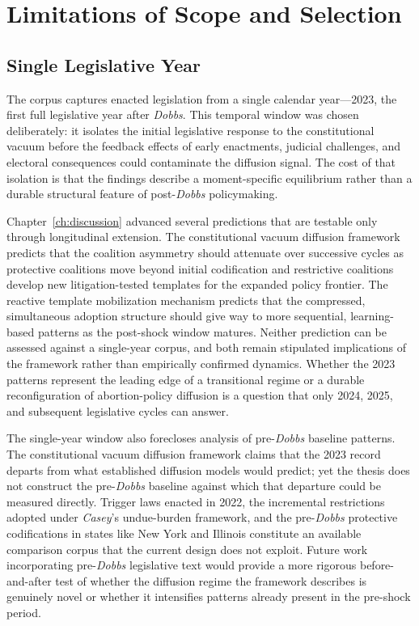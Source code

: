 \section{Limitations of Scope and Selection}
\label{sec:limits-scope}

\subsection{Single Legislative Year}
\label{subsec:single-year}

The corpus captures enacted legislation from a single calendar year---2023, the first full legislative year after \emph{Dobbs}. This temporal window was chosen deliberately: it isolates the initial legislative response to the constitutional vacuum before the feedback effects of early enactments, judicial challenges, and electoral consequences could contaminate the diffusion signal. The cost of that isolation is that the findings describe a moment-specific equilibrium rather than a durable structural feature of post-\emph{Dobbs} policymaking.

Chapter~\ref{ch:discussion} advanced several predictions that are testable only through longitudinal extension. The constitutional vacuum diffusion framework predicts that the coalition asymmetry should attenuate over successive cycles as protective coalitions move beyond initial codification and restrictive coalitions develop new litigation-tested templates for the expanded policy frontier. The reactive template mobilization mechanism predicts that the compressed, simultaneous adoption structure should give way to more sequential, learning-based patterns as the post-shock window matures. Neither prediction can be assessed against a single-year corpus, and both remain stipulated implications of the framework rather than empirically confirmed dynamics. Whether the 2023 patterns represent the leading edge of a transitional regime or a durable reconfiguration of abortion-policy diffusion is a question that only 2024, 2025, and subsequent legislative cycles can answer.

The single-year window also forecloses analysis of pre-\emph{Dobbs} baseline patterns. The constitutional vacuum diffusion framework claims that the 2023 record departs from what established diffusion models would predict; yet the thesis does not construct the pre-\emph{Dobbs} baseline against which that departure could be measured directly. Trigger laws enacted in 2022, the incremental restrictions adopted under \emph{Casey}'s undue-burden framework, and the pre-\emph{Dobbs} protective codifications in states like New York and Illinois constitute an available comparison corpus that the current design does not exploit. Future work incorporating pre-\emph{Dobbs} legislative text would provide a more rigorous before-and-after test of whether the diffusion regime the framework describes is genuinely novel or whether it intensifies patterns already present in the pre-shock period.

